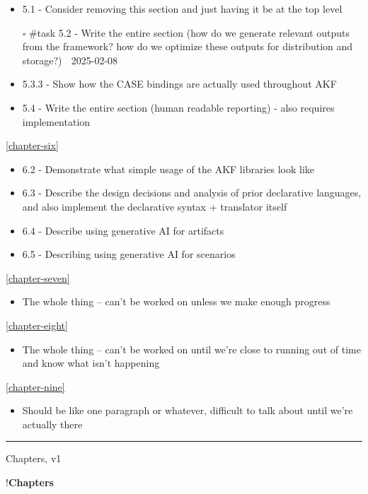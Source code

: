 \begin{itemize}
\tightlist
\item
  5.1 - Consider removing this section and just having it be at the top
  level
\item[$\square$]
  \#task 5.2 - Write the entire section (how do we generate relevant
  outputs from the framework? how do we optimize these outputs for
  distribution and storage?) 📅 2025-02-08
\item
  5.3.3 - Show how the CASE bindings are actually used throughout AKF
\item
  5.4 - Write the entire section (human readable reporting) - also
  requires implementation
\end{itemize}

\autoref{chapter-six}

\begin{itemize}
\tightlist
\item
  6.2 - Demonstrate what simple usage of the AKF libraries look like
\item
  6.3 - Describe the design decisions and analysis of prior declarative
  languages, and also implement the declarative syntax + translator
  itself
\item
  6.4 - Describe using generative AI for artifacts
\item
  6.5 - Describing using generative AI for scenarios
\end{itemize}

\autoref{chapter-seven}

\begin{itemize}
\tightlist
\item
  The whole thing -- can't be worked on unless we make enough progress
\end{itemize}

\autoref{chapter-eight}

\begin{itemize}
\tightlist
\item
  The whole thing -- can't be worked on until we're close to running out
  of time and know what isn't happening
\end{itemize}

\autoref{chapter-nine}

\begin{itemize}
\tightlist
\item
  Should be like one paragraph or whatever, difficult to talk about
  until we're actually there
\end{itemize}

\begin{center}\rule{0.5\linewidth}{0.5pt}\end{center}

Chapters, v1

!\textbf{Chapters}

